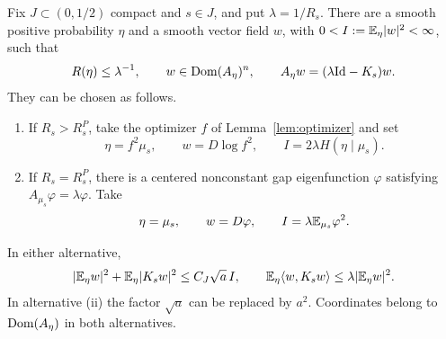 \begin{lemma}
\label{lem:critical-two-alternatives}
Fix $J\subset(0,1/2)$ compact and $s\in J$, and put
$\lambda=1/R_s$. There are a smooth positive probability $\eta$
and a smooth vector field $w$, with
$0<I:=\mathbb E_\eta|w|^2<\infty$, such that
\begin{equation}\label{eq:critical-common-identities}
 R(\eta)\le\lambda^{-1},\qquad
 w\in\operatorname{Dom}(A_\eta)^n,\qquad
 A_\eta w=(\lambda\mathrm{Id}-K_s)w.
\end{equation}
They can be chosen as follows.
\begin{enumerate}[label=\textup{(\roman*)}]
\item If $R_s>R_s^P$, take the optimizer $f$ of
Lemma~\ref{lem:optimizer} and set
\[
 \eta=f^2\mu_s,\qquad w=D\log f^2,
 \qquad I=2\lambda H(\eta\mid\mu_s).
\]
\item If $R_s=R_s^P$, there is a centered nonconstant gap
eigenfunction $\varphi$ satisfying
$A_{\mu_s}\varphi=\lambda\varphi$. Take
\[
 \eta=\mu_s,\qquad w=D\varphi,
 \qquad I=\lambda\mathbb E_{\mu_s}\varphi^2.
\]
\end{enumerate}
In either alternative,
\begin{equation}\label{eq:critical-uniform-smallness}
 |\mathbb E_\eta w|^2+\mathbb E_\eta|K_sw|^2\le C_J\sqrt a\,I,
 \qquad
 \mathbb E_\eta\langle w,K_sw\rangle\le\lambda|\mathbb E_\eta w|^2.
\end{equation}
In alternative \textup{(ii)} the factor $\sqrt a$ can be
replaced by $a^2$. Coordinates belong to $\operatorname{Dom}(A_\eta)$ in
both alternatives.
\end{lemma}

